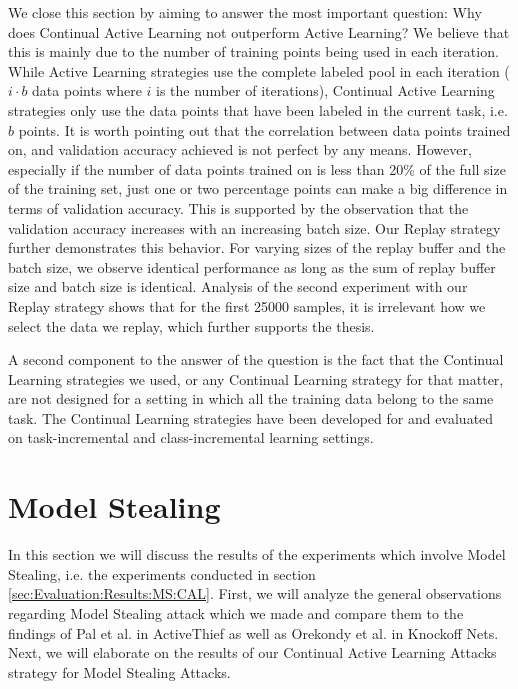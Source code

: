 We close this section by aiming to answer the most important question: Why does Continual Active Learning not outperform Active Learning? We believe that this is mainly due to the number of training points being used in each iteration. While Active Learning strategies use the
complete labeled pool in each iteration ($i \cdot b$ data points where $i$ is the number of iterations), Continual Active Learning strategies only use the data points that have been labeled in the current task, i.e. $b$ points. It is worth pointing out that the correlation between
data points trained on, and validation accuracy achieved is not perfect by any means. However, especially if the number of data points trained on is less than 20\% of the full size of the training set, just one or two percentage points can make a big difference in terms of validation
accuracy. This is supported by the observation that the validation accuracy increases with an increasing batch size. Our Replay strategy further demonstrates this behavior. For varying sizes of the replay buffer and the batch size, we observe identical performance as long as the sum
of replay buffer size and batch size is identical. Analysis of the second experiment with our Replay strategy shows that for the first 25000 samples, it is irrelevant how we select the data we replay, which further supports the thesis. \par
A second component to the answer of the question is the fact that the Continual Learning strategies we used, or any Continual Learning strategy for that matter, are not designed for a setting in which all the training data belong to the same task. The Continual Learning strategies have
been developed for and evaluated on task-incremental and class-incremental learning settings.


\section{Model Stealing}
\label{sec:Discussion:ModelStealing}
In this section we will discuss the results of the experiments which involve Model Stealing, i.e. the experiments conducted in section \ref{sec:Evaluation:Results:MS:CAL}. First, we will analyze the general observations regarding Model Stealing attack which we made and compare them
to the findings of Pal et al. in ActiveThief as well as Orekondy et al. in Knockoff Nets. Next, we will elaborate on the results of our Continual Active Learning Attacks strategy for Model Stealing Attacks.

